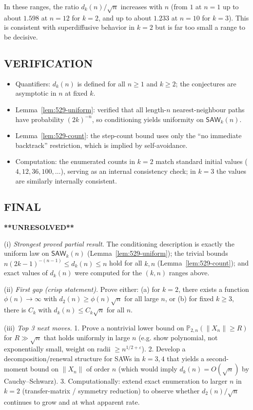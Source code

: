 In these ranges, the ratio $d_k(n)/\sqrt n$ increases with $n$ (from $1$ at $n=1$ up to about $1.598$ at $n=12$ for $k=2$, and up to about $1.233$ at $n=10$ for $k=3$). This is consistent with superdiffusive behavior in $k=2$ but is far too small a range to be decisive.

\subsection*{VERIFICATION}
\begin{itemize}
\item Quantifiers: $d_k(n)$ is defined for all $n\ge 1$ and $k\ge 2$; the conjectures are asymptotic in $n$ at fixed $k$.
\item Lemma~\ref{lem:529-uniform}: verified that all length-$n$ nearest-neighbour paths have probability $(2k)^{-n}$, so conditioning yields uniformity on $\mathsf{SAW}_k(n)$.
\item Lemma~\ref{lem:529-count}: the step-count bound uses only the ``no immediate backtrack'' restriction, which is implied by self-avoidance.
\item Computation: the enumerated counts in $k=2$ match standard initial values ($4,12,36,100,\dots$), serving as an internal consistency check; in $k=3$ the values are similarly internally consistent.
\end{itemize}

\subsection*{FINAL}
\textbf{**UNRESOLVED**}

(i) \emph{Strongest proved partial result.} The conditioning description is exactly the uniform law on $\mathsf{SAW}_k(n)$ (Lemma~\ref{lem:529-uniform}); the trivial bounds $n(2k-1)^{-(n-1)}\le d_k(n)\le n$ hold for all $k,n$ (Lemma~\ref{lem:529-count}); and exact values of $d_k(n)$ were computed for the $(k,n)$ ranges above.

(ii) \emph{First gap (crisp statement).} Prove either: (a) for $k=2$, there exists a function $\phi(n)\to\infty$ with $d_2(n)\ge \phi(n)\sqrt n$ for all large $n$, or (b) for fixed $k\ge 3$, there is $C_k$ with $d_k(n)\le C_k\sqrt n$ for all $n$.

(iii) \emph{Top 3 next moves.}
1. Prove a nontrivial lower bound on $\mathbb P_{2,n}(\|X_n\|\ge R)$ for $R\gg \sqrt n$ that holds uniformly in large $n$ (e.g. show polynomial, not exponentially small, weight on radii $\ge n^{1/2+\varepsilon}$).
2. Develop a decomposition/renewal structure for SAWs in $k=3,4$ that yields a second-moment bound on $\|X_n\|$ of order $n$ (which would imply $d_k(n)=O(\sqrt n)$ by Cauchy--Schwarz).
3. Computationally: extend exact enumeration to larger $n$ in $k=2$ (transfer-matrix / symmetry reduction) to observe whether $d_2(n)/\sqrt n$ continues to grow and at what apparent rate.

